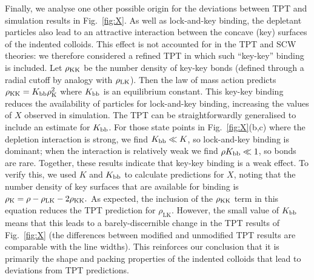 \documentclass[8.5pt,oneside,onecolumn]{article}
\newcommand{\rhoK}{\rho_\mathrm{K}}
\newcommand{\rhoLK}{\rho_\mathrm{LK}}
\begin{document}
Finally, we analyse one other possible origin for the deviations between TPT and simulation results
in Fig.~\ref{fig:X}.  As well as lock-and-key binding, the depletant particles also lead to an
attractive interaction between the concave (key) surfaces of the indented colloids.  This effect is
not accounted for in the TPT and SCW theories: we therefore considered a refined TPT in which
such ``key-key'' binding is included.  Let $\rho_{\rm KK}$ be the number density of key-key bonds 
(defined through a radial cutoff by analogy with $\rho_{\rm LK}$).  
Then the law of mass action predicts
$
 \rho_{\rm KK} = K_{\rm bb} \rho_{\rm K}^2
$
where $K_{\rm bb}$ 
is an equilibrium constant.  This key-key binding reduces the availability of particles for lock-and-key binding,
increasing the values of $X$ observed in simulation.  The TPT can be straightforwardly generalised
to include an estimate for $K_{\rm bb}$.  For those state points in Fig.~\ref{fig:X}(b,c)  
where the depletion interaction is strong, we find
 $K_{\rm bb} \ll K$, so lock-and-key binding is dominant; 
 when the interaction is relatively weak we find $\rho K_{\rm bb} \ll 1$, so bonds are rare.  Together, these results indicate
that key-key binding is a weak effect.  To verify this, we used $K$ and $K_{\rm bb}$ to calculate predictions
for $X$, noting
that the number density of key surfaces that are available for binding is 
$
  \rhoK = \rho  - \rhoLK - 2\rho_{\rm KK}.
$
As expected, the inclusion of the $\rho_{\rm KK}$ term in this equation reduces the TPT prediction for $\rhoLK$.  However,
the small value of $K_{\rm bb}$ means that this leads to a barely-discernible change in the TPT results
of Fig.~\ref{fig:X} (the differences between modified and unmodified TPT results are 
comparable with the line widths).  This reinforces our conclusion that it is primarily the shape and packing
properties of the indented colloids that lead to deviations from TPT predictions.


\end{document}
